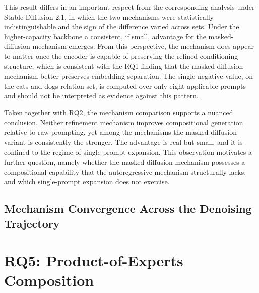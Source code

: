 \documentclass[a4paper,twoside,12pt]{report}
\begin{document}
This result differs in an important respect from the corresponding analysis
under Stable Diffusion 2.1, in which the two mechanisms were statistically
indistinguishable and the sign of the difference varied across sets. Under the
higher-capacity backbone a consistent, if small, advantage for the
masked-diffusion mechanism emerges. From this perspective, the mechanism does
appear to matter once the encoder is capable of preserving the refined
conditioning structure, which is consistent with the RQ1 finding that the
masked-diffusion mechanism better preserves embedding separation. The single
negative value, on the cats-and-dogs relation set, is computed over only eight
applicable prompts and should not be interpreted as evidence against this
pattern.

Taken together with RQ2, the mechanism comparison supports a nuanced
conclusion. Neither refinement mechanism improves compositional generation
relative to raw prompting, yet among the mechanisms the masked-diffusion variant
is consistently the stronger. The advantage is real but small, and it is
confined to the regime of single-prompt expansion. This observation motivates a
further question, namely whether the masked-diffusion mechanism possesses a
compositional capability that the autoregressive mechanism structurally lacks,
and which single-prompt expansion does not exercise.

\subsection{Mechanism Convergence Across the Denoising Trajectory}
\label{sec:rq4_trajectory}

\section{RQ5: Product-of-Experts Composition}
\label{sec:rq5}
\end{document}
